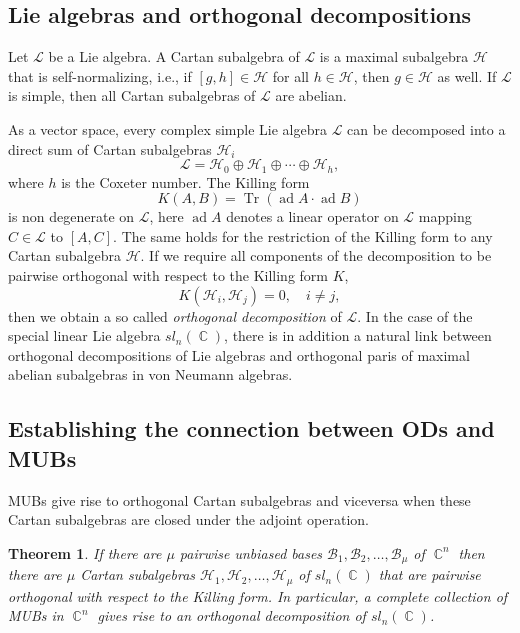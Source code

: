 \documentclass[a4paper]{article}
\DeclareMathOperator{\C}{\mathbb{C}}
\DeclareMathOperator{\Tr}{Tr}
\DeclareMathOperator{\ad}{ad}
\newtheorem{theorem}{Theorem}
\begin{document}
  \subsection{Lie algebras and orthogonal decompositions}

  Let $\mathcal{L}$ be a Lie algebra. A Cartan subalgebra of
  $\mathcal{L}$ is a maximal subalgebra $\mathcal{H}$ that
  is self-normalizing, i.e., if $[g,h] \in \mathcal{H}$ for
  all $h \in \mathcal{H}$, then $g \in \mathcal{H}$ as well.
  If $\mathcal{L}$ is simple, then all Cartan subalgebras of
  $\mathcal{L}$ are abelian.

  As a vector space, every complex simple Lie algebra
  $\mathcal{L}$ can be decomposed into a direct sum of
  Cartan subalgebras $\mathcal{H}_i$ 
  \[
    \mathcal{L}
    = \mathcal{H}_0 \oplus \mathcal{H}_1 \oplus \cdots
    \oplus
    \mathcal{H}_h,
  \] 
  where $h$ is the Coxeter number. The Killing form
  \[
    K(A,B)
    = \Tr(\ad A \cdot \ad B)
  \] 
  is non degenerate on $\mathcal{L}$, here $\ad A$ denotes a
  linear operator on $\mathcal{L}$ mapping $C \in
  \mathcal{L}$ to $[A,C]$. The same holds for the
  restriction of the Killing form to any Cartan subalgebra
  $\mathcal{H}$. If we require all components of the
  decomposition to be pairwise orthogonal with respect to
  the Killing form $K$,
  \[
    K(\mathcal{H}_i,\mathcal{H}_j) = 0,
    \quad i \neq j,
  \] 
  then we obtain a so called \textit{orthogonal
  decomposition} of $\mathcal{L}$. In the case of the
  special linear Lie algebra $sl_n(\C)$, there is in
  addition a natural link between orthogonal decompositions
  of Lie algebras and orthogonal paris of maximal abelian
  subalgebras in von Neumann algebras.

  \subsection{Establishing the connection between ODs and
  MUBs}

  MUBs give rise to orthogonal Cartan subalgebras and
  viceversa when these Cartan subalgebras are closed under
  the adjoint operation.

  \begin{theorem}
    If there are $\mu$ pairwise unbiased bases
    $\mathcal{B}_1,\mathcal{B}_2,\ldots,\mathcal{B}_\mu$ of
    $\C^{n}$ then there are $\mu$ Cartan subalgebras
    $\mathcal{H}_1,\mathcal{H}_2,\ldots,\mathcal{H}_\mu$ of
    $sl_n(\C)$ that are pairwise orthogonal with respect to
    the Killing form. In particular, a complete collection
    of MUBs in $\C^{n}$ gives rise to an orthogonal
    decomposition of $sl_n(\C)$.
  \end{theorem}
\end{document}
